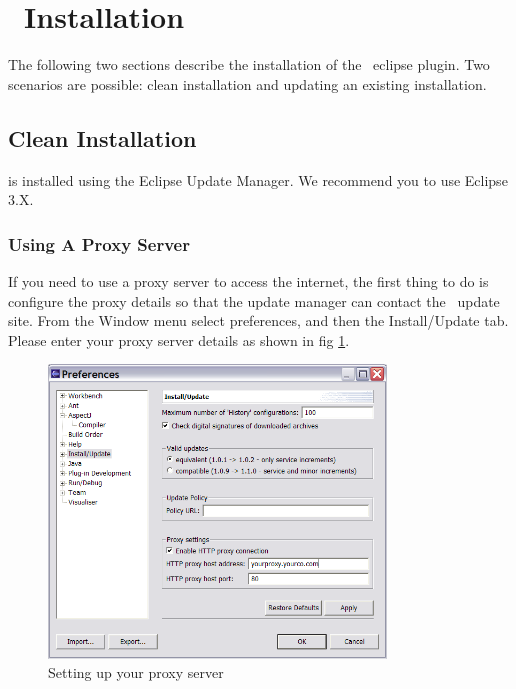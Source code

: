 \section{\cjdt ~Installation}
The following two sections describe the installation of the \caesarj ~eclipse plugin. Two scenarios are possible: clean installation and updating an existing installation.
\subsection{Clean Installation} 
\cjdt is installed using the Eclipse Update Manager. We recommend you to use Eclipse 3.X.
\subsubsection{Using A Proxy Server} 
If you need to use a proxy server to access the internet, the first thing
to do is configure the proxy details so that the update manager can contact the
\cjdt ~update site. From the Window menu select preferences, and then the
Install/Update tab. Please enter your proxy server details as shown in fig \ref{fig:proxy}.
\begin{figure}[htbp]
	\centering
		\includegraphics[width=0.80\textwidth]{./images/proxy.png}
	\caption{Setting up your proxy server}
	\label{fig:proxy}
\end{figure}

